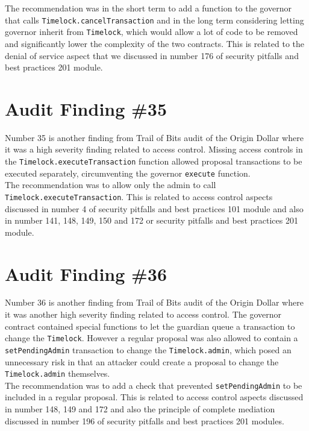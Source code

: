 The recommendation was in the short term to add a function to the governor that calls \verb|Timelock.cancelTransaction| and in the long term considering letting governor inherit from \verb|Timelock|, which would allow a lot of code to be removed and significantly lower the complexity of the two contracts. This is related to the denial of service aspect that we discussed in number 176 of security pitfalls and best practices 201 module.

\section{Audit Finding \#35}

Number 35 is another finding from Trail of Bits audit of the Origin Dollar where it was a high severity finding related to access control. Missing access controls in the \verb|Timelock.executeTransaction| function allowed proposal transactions to be executed separately, circumventing the governor \verb|execute| function.\\

The recommendation was to allow only the admin to call \verb|Timelock.executeTransaction|. This is related to access control aspects discussed in number 4 of security pitfalls and best practices 101 module and also in number 141, 148, 149, 150 and 172 or security pitfalls and best practices 201 module.

\section{Audit Finding \#36}

Number 36 is another finding from Trail of Bits audit of the Origin Dollar where it was another high severity finding related to access control. The governor contract contained special functions to let the guardian queue a transaction to change the \verb|Timelock|. However a regular proposal was also allowed to contain a \verb|setPendingAdmin| transaction to change the \verb|Timelock.admin|, which posed an unnecessary risk in that an attacker could create a proposal to change the \verb|Timelock.admin| themselves.\\

The recommendation was to add a check that prevented \verb|setPendingAdmin| to be included in a regular proposal. This is related to access control aspects discussed in number 148, 149 and 172 and also the principle of complete mediation discussed in number 196 of security pitfalls and best practices 201 modules.

